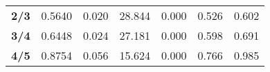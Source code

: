 \begin{center}
\begin{tabular}{lcccccc}
\textbf{2/3}                             &       0.5640  &        0.020     &    28.844  &         0.000        &        0.526    &        0.602     \\
\textbf{3/4}                             &       0.6448  &        0.024     &    27.181  &         0.000        &        0.598    &        0.691     \\
\textbf{4/5}                             &       0.8754  &        0.056     &    15.624  &         0.000        &        0.766    &        0.985     \\
\bottomrule
\end{tabular}
\end{center}
